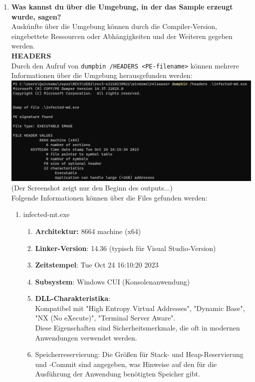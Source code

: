 \documentclass{article}
\begin{document}
\begin{enumerate}
		\item \textbf{Was kannst du über die Umgebung, in der das Sample erzeugt wurde, sagen?}\\
		Auskünfte über die Umgebung können durch die Compiler-Version, eingebettete Ressourcen oder Abhängigkeiten und der Weiteren gegeben werden.\\
		\textbf{HEADERS}\\
		Durch den Aufruf von \texttt{dumpbin /HEADERS <PE-filename>} können mehrere Informationen über die Umgebung herausgefunden werden:\\
		\includegraphics[width=1\linewidth]{pictures/1. umgebung}\\
		(Der Screenshot zeigt nur den Beginn des outputs...)\\
		Folgende Informationen können über die Files gefunden werden:\\
		\begin{enumerate}
			\item infected-mt.exe
			\begin{enumerate}
				\item \textbf{Architektur:} 8664 machine (x64)
				\item \textbf{Linker-Version}: 14.36 (typisch für Visual Studio-Version)
				\item \textbf{Zeitstempel}: Tue Oct 24 16:10:20 2023
				\item \textbf{Subsystem}: Windows CUI (Konsolenanwendung)
				\item \textbf{DLL-Charakteristika}:\\
				Kompatibel mit "High Entropy Virtual Addresses", "Dynamic Base", "NX (No eXecute)", "Terminal Server Aware".\\
				Diese Eigenschaften sind Sicherheitsmerkmale, die oft in modernen Anwendungen verwendet werden.
				\item Speicherreservierung: Die Größen für Stack- und Heap-Reservierung und -Commit sind angegeben, was Hinweise auf den für die Ausführung der Anwendung benötigten Speicher gibt.

\end{enumerate}
\end{enumerate}
\end{enumerate}
\end{document}

